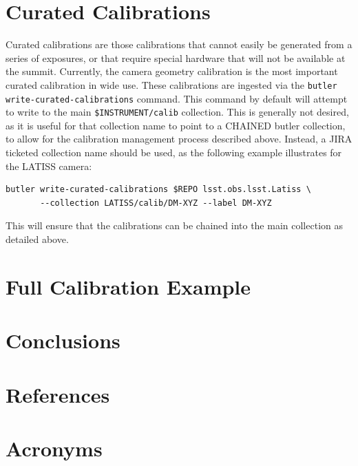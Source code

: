 \documentclass[DM,authoryear,toc]{lsstdoc}
\begin{document}
\section{Curated Calibrations}

Curated calibrations are those calibrations that cannot easily be generated from a series of exposures, or that require special hardware that will not be available at the summit.
Currently, the camera geometry calibration is the most important curated calibration in wide use.
These calibrations are ingested via the \verb|butler write-curated-calibrations| command.
This command by default will attempt to write to the main \verb|$INSTRUMENT/calib| collection.
This is generally not desired, as it is useful for that collection name to point to a CHAINED butler collection, to allow for the calibration management process described above.
Instead, a JIRA ticketed collection name should be used, as the following example illustrates for the LATISS camera:
\begin{verbatim}
butler write-curated-calibrations $REPO lsst.obs.lsst.Latiss \
       --collection LATISS/calib/DM-XYZ --label DM-XYZ
\end{verbatim}

This will ensure that the calibrations can be chained into the main collection as detailed above.

\section{Full Calibration Example}

\section{Conclusions}

\appendix
\section{References} \label{sec:bib}
\renewcommand{\refname}{} %


\section{Acronyms} \label{sec:acronyms}

\end{document}
